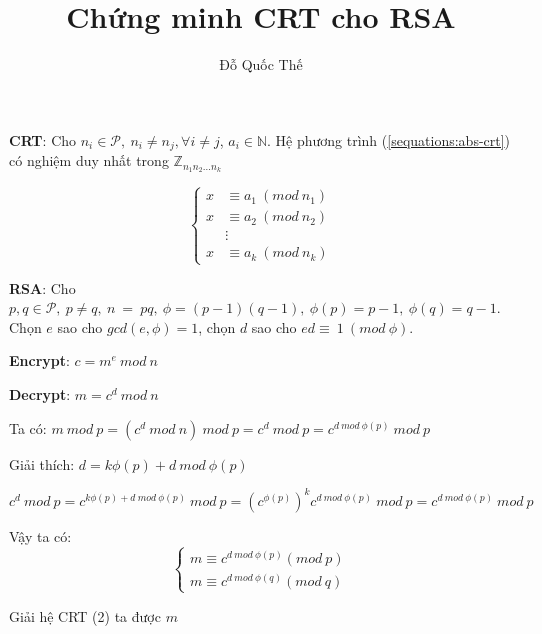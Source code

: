 \documentclass[12pt]{article}
\author{Đỗ Quốc Thế}
\title{Chứng minh CRT cho RSA}
\begin{document}
\maketitle

\textbf{CRT}: Cho $n_i \in \mathcal{P},\ n_i \neq n_j, \forall i \neq j$, $a_i \in \mathbb{N}$. Hệ phương trình (\ref{sequations:abs-crt}) có nghiệm duy nhất trong $\mathbb{Z}_{n_1n_2\hdots n_k}$

\begin{equation}\label{sequations:abs-crt}
\begin{cases}
x &\equiv a_1\ (mod\ n_1) \\
x &\equiv a_2\ (mod\ n_2) \\
& \vdots \\
x &\equiv a_k\ (mod\ n_k)
\end{cases}
\end{equation}


\textbf{RSA}: Cho $p,q \in \mathcal{P},\ p \neq q,\ n\ =\ pq,\ \phi=(p-1)(q-1),\ \phi(p)=p-1,\ \phi(q)=q-1$. Chọn $e$ sao cho $gcd(e,\phi)=1$, chọn $d$ sao cho $ed\equiv\ 1\ (mod\ \phi)$.

\textbf{Encrypt}: $c=m^e\ mod\ n$

\textbf{Decrypt}: $m=c^d\ mod\ n$

Ta có: $m\ mod\ p=(c^d\ mod\ n)\ mod\ p =c^d\ mod\ p = c^{d\ mod\ \phi(p)}\ mod\ p$

Giải thích: $d = k\phi(p) + d\ mod\ \phi(p)$

$c^d\ mod\ p = c^{k\phi(p) + d\ mod\ \phi(p)}\ mod\ p=(c^{\phi(p)})^kc^{d\ mod\ \phi(p)}\ mod\ p = c^{d\ mod\ \phi(p)}\ mod\ p$

Vậy ta có: 
\begin{equation}\label{sequations:rsa-crt}
\begin{cases}
m \equiv c^{d\ mod\ \phi(p)} (mod\ p) \\
m \equiv c^{d\ mod\ \phi(q)} (mod\ q)
\end{cases}
\end{equation}

Giải hệ CRT (2) ta được $m$
\end{document}
